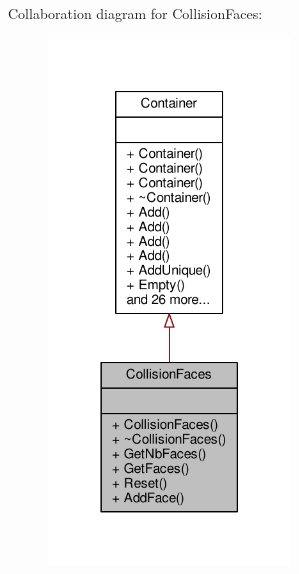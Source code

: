 Collaboration diagram for Collision\+Faces\+:
\nopagebreak
\begin{figure}[H]
\begin{center}
\leavevmode
\includegraphics[width=182pt]{d7/d9b/classCollisionFaces__coll__graph}
\end{center}
\end{figure}
